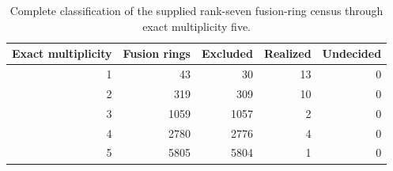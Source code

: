 \begin{table}[H]
\centering
\caption{Complete classification of the supplied rank-seven fusion-ring census through exact multiplicity five.}\label{tab:status}
\begin{tabular}{@{}r r r r r@{}}
\toprule
Exact multiplicity & Fusion rings & Excluded & Realized & Undecided\\
\midrule
1 & 43 & 30 & 13 & 0\\
2 & 319 & 309 & 10 & 0\\
3 & 1059 & 1057 & 2 & 0\\
4 & 2780 & 2776 & 4 & 0\\
5 & 5805 & 5804 & 1 & 0\\
\bottomrule
\end{tabular}
\end{table}

